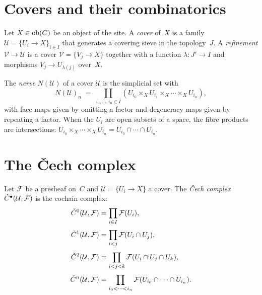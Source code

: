 \section{Covers and their combinatorics}
\label{sec:covers}

\begin{definition}[Cover]
\label{def:cover}
Let $X \in \mathrm{ob}(C)$ be an object of the site.  A \emph{cover} of~$X$
is a family $\mathcal{U} = \{U_i \to X\}_{i \in I}$ that generates a
covering sieve in the topology~$J$.  A \emph{refinement}
$\mathcal{V} \to \mathcal{U}$ is a cover $\mathcal{V} = \{V_j \to X\}$
together with a function $\lambda : J' \to I$ and morphisms
$V_j \to U_{\lambda(j)}$ over~$X$.
\end{definition}

\begin{definition}[Nerve]
\label{def:nerve}
The \emph{nerve} $N(\mathcal{U})$ of a cover $\mathcal{U}$ is the
simplicial set with
\[
  N(\mathcal{U})_n \;=\;
  \coprod_{i_0, \ldots, i_n \in I}
  (U_{i_0} \times_X U_{i_1} \times_X \cdots \times_X U_{i_n}),
\]
with face maps given by omitting a factor and degeneracy maps given by
repeating a factor.  When the $U_i$ are open subsets of a space, the
fibre products are intersections:
$U_{i_0} \times_X \cdots \times_X U_{i_n} = U_{i_0} \cap \cdots \cap U_{i_n}$.
\end{definition}

\section{The \v{C}ech complex}
\label{sec:cech-complex}

\begin{definition}
\label{def:cech}
Let $\mathcal{F}$ be a presheaf on~$C$ and $\mathcal{U} = \{U_i \to X\}$
a cover.  The \emph{\v{C}ech complex}
$\check{C}^\bullet(\mathcal{U}, \mathcal{F})$ is the cochain complex:
\begin{align*}
  \check{C}^0(\mathcal{U}, \mathcal{F})
  &= \prod_{i \in I} \mathcal{F}(U_i),
  \\[3pt]
  \check{C}^1(\mathcal{U}, \mathcal{F})
  &= \prod_{i < j} \mathcal{F}(U_i \cap U_j),
  \\[3pt]
  \check{C}^2(\mathcal{U}, \mathcal{F})
  &= \prod_{i < j < k} \mathcal{F}(U_i \cap U_j \cap U_k),
  \\[3pt]
  \check{C}^n(\mathcal{U}, \mathcal{F})
  &= \prod_{i_0 < \cdots < i_n}
  \mathcal{F}(U_{i_0} \cap \cdots \cap U_{i_n}).
\end{align*}
\end{definition}

